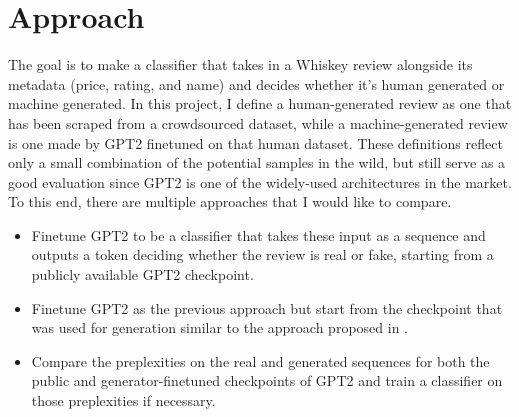 \documentclass{article}
\begin{document}
\section{Approach}
The goal is to make a classifier that takes in a Whiskey review alongside its metadata (price, rating, and name) and decides whether it's human generated or machine generated.  In this project, I define a human-generated review as one that has been scraped from a crowdsourced dataset, while a machine-generated review is one made by GPT2 finetuned on that human dataset. These definitions reflect only a small combination of the potential samples in the wild, but still serve as a good evaluation since GPT2 is one of the widely-used architectures in the market. To this end, there are multiple approaches that I would like to compare. 
\begin{itemize}
\item Finetune GPT2 to be a classifier that takes these input as a sequence and outputs a token deciding whether the review is real or fake, starting from a publicly available GPT2 checkpoint.
\item Finetune GPT2 as the previous approach but start from the checkpoint that was used for generation similar to the approach proposed in \cite{zellers2020defending}.
\item Compare the preplexities on the real and generated sequences for both the public and generator-finetuned checkpoints of GPT2 and train a classifier on those preplexities if necessary. 
\end{itemize}
\end{document}
